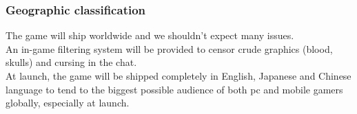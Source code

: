 \subsubsection{Geographic classification}
The game will ship worldwide and we shouldn't expect many issues. \\

An in-game filtering system will be provided to censor crude graphics (blood, skulls) and cursing in the chat. \\

At launch, the game will be shipped completely in English, Japanese and Chinese language to tend to the biggest possible audience of both pc and mobile gamers globally, especially at launch. \\

\clearpage